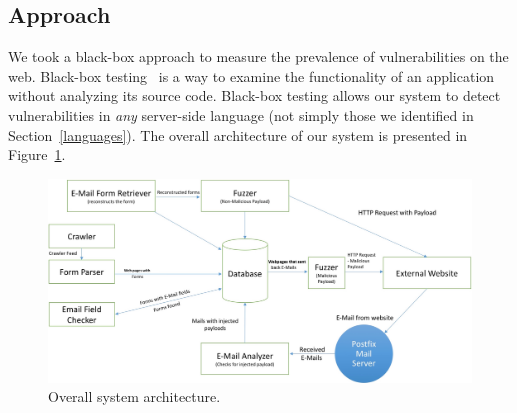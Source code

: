 \subsection{Approach}

\label{sys:appr}
We took a black-box approach to measure the prevalence of \ehi
vulnerabilities on the web. Black-box
testing~\cite{Beizer:1995:BTT:202699} is a way to examine the
functionality of an application without analyzing its source code. Black-box testing allows our system to detect \ehi vulnerabilities in \emph{any} server-side language (not simply those we identified in Section~\ref{languages}). The overall architecture of our system is presented in Figure~\ref{fig:overall}. 

\begin{figure}[tb]
	\centering
	\includegraphics[width=.5\textwidth]{overall_crop}
	\caption{Overall system architecture.}
    
	\label{fig:overall}
\end{figure}
